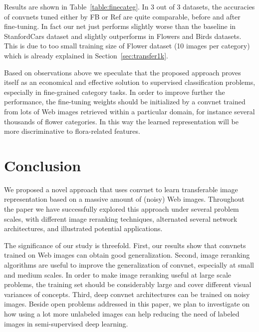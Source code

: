 \documentclass[preprint,12pt]{elsarticle}
\begin{document}
Results are shown in Table~\ref{table:finecateg}. In 3 out of 3 datasets, the accuracies of convnets tuned either by FB or Ref are quite comparable, before and after fine-tuning. In fact our net just performs slightly worse than the baseline in StanfordCars dataset and slightly outperforms in Flowers and Birds datasets. This is due to too small training size of Flower dataset (10 images per category) which is already explained in Section~\ref{sec:transfer1k}.

Based on observations above we speculate that the proposed approach proves itself as an economical and effective solution to supervised classification problems, especially in fine-grained category tasks. In order to improve further the performance, the fine-tuning weights should be initialized by a convnet trained from lots of Web images retrieved within a particular domain, for instance several thousands of flower categories. In this way the learned representation will be more discriminative to flora-related features. 

\section{Conclusion}\label{sec:conclu}
We proposed a novel approach that uses convnet to learn transferable image representation based on a  massive amount of (noisy) Web images. Throughout the paper we have successfully explored this approach under several problem scales, with different image reranking techniques, alternated several network architectures, and illustrated potential applications.

The significance of our study is threefold. First, our results show that convnets trained on Web images can obtain good generalization. Second, image reranking algorithms are useful to improve the generalization of convnet, especially at small and medium scales. In order to make image reranking useful at large scale problems, the training set should be considerably large and cover different visual variances of concepts. Third, deep convnet architectures can be trained on noisy images. Beside open problems addressed in this paper, we plan to investigate on how using a lot more unlabeled images can help reducing the need of labeled images in semi-supervised deep learning.
%
\end{document}
